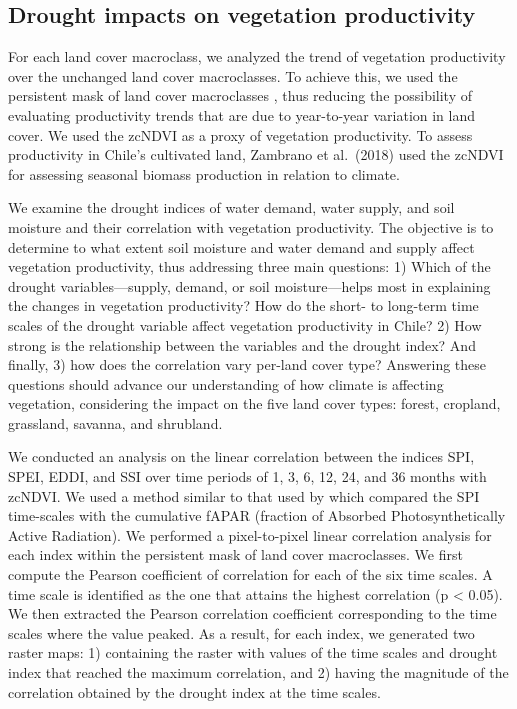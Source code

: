 \documentclass[
  authoryear,
  preprint,
  3p,
  onecolumn]{elsarticle}
\begin{document}
\hypertarget{drought-impacts-on-vegetation-productivity}{%
\subsection{Drought impacts on vegetation
productivity}\label{drought-impacts-on-vegetation-productivity}}

For each land cover macroclass, we analyzed the trend of vegetation
productivity over the unchanged land cover macroclasses. To achieve
this, we used the persistent mask of land cover macroclasses , thus
reducing the possibility of evaluating productivity trends that are due
to year-to-year variation in land cover. We used the zcNDVI as a proxy
of vegetation productivity. To assess productivity in Chile's cultivated
land, Zambrano et al.~(2018) used the zcNDVI for assessing seasonal
biomass production in relation to climate.

We examine the drought indices of water demand, water supply, and soil
moisture and their correlation with vegetation productivity. The
objective is to determine to what extent soil moisture and water demand
and supply affect vegetation productivity, thus addressing three main
questions: 1) Which of the drought variables---supply, demand, or soil
moisture---helps most in explaining the changes in vegetation
productivity? How do the short- to long-term time scales of the drought
variable affect vegetation productivity in Chile? 2) How strong is the
relationship between the variables and the drought index? And finally,
3) how does the correlation vary per-land cover type? Answering these
questions should advance our understanding of how climate is affecting
vegetation, considering the impact on the five land cover types: forest,
cropland, grassland, savanna, and shrubland.

We conducted an analysis on the linear correlation between the indices
SPI, SPEI, EDDI, and SSI over time periods of 1, 3, 6, 12, 24, and 36
months with zcNDVI. We used a method similar to that used by
\citet{Meroni2017} which compared the SPI time-scales with the
cumulative fAPAR (fraction of Absorbed Photosynthetically Active
Radiation). We performed a pixel-to-pixel linear correlation analysis
for each index within the persistent mask of land cover macroclasses. We
first compute the Pearson coefficient of correlation for each of the six
time scales. A time scale is identified as the one that attains the
highest correlation (p \textless{} 0.05). We then extracted the Pearson
correlation coefficient corresponding to the time scales where the value
peaked. As a result, for each index, we generated two raster maps: 1)
containing the raster with values of the time scales and drought index
that reached the maximum correlation, and 2) having the magnitude of the
correlation obtained by the drought index at the time scales.
\end{document}
